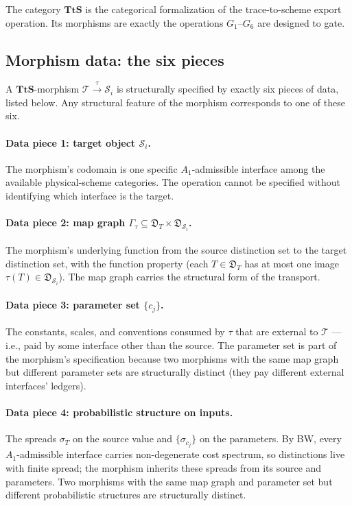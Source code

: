 The category $\mathbf{TtS}$ is the categorical formalization of the trace-to-scheme export operation. Its morphisms are exactly the operations $G_1$--$G_6$ are designed to gate.

\subsection{Morphism data: the six pieces}
\label{subsec:morphism-data}

\begin{lemma}
\label{lem:morphism-data}
A $\mathbf{TtS}$-morphism $\mathcal{T} \xrightarrow{\tau} \mathcal{S}_i$ is structurally specified by exactly six pieces of data, listed below. Any structural feature of the morphism corresponds to one of these six.
\end{lemma}

\paragraph{Data piece 1: target object $\mathcal{S}_i$.} The morphism's codomain is one specific $A_1$-admissible interface among the available physical-scheme categories. The operation cannot be specified without identifying which interface is the target.

\paragraph{Data piece 2: map graph $\Gamma_\tau \subseteq \mathfrak{D}_T \times \mathfrak{D}_{\mathcal{S}_i}$.} The morphism's underlying function from the source distinction set to the target distinction set, with the function property (each $T \in \mathfrak{D}_T$ has at most one image $\tau(T) \in \mathfrak{D}_{\mathcal{S}_i}$). The map graph carries the structural form of the transport.

\paragraph{Data piece 3: parameter set $\{c_j\}$.} The constants, scales, and conventions consumed by $\tau$ that are external to $\mathcal{T}$ — i.e., paid by some interface other than the source. The parameter set is part of the morphism's specification because two morphisms with the same map graph but different parameter sets are structurally distinct (they pay different external interfaces' ledgers).

\paragraph{Data piece 4: probabilistic structure on inputs.} The spreads $\sigma_T$ on the source value and $\{\sigma_{c_j}\}$ on the parameters. By BW, every $A_1$-admissible interface carries non-degenerate cost spectrum, so distinctions live with finite spread; the morphism inherits these spreads from its source and parameters. Two morphisms with the same map graph and parameter set but different probabilistic structures are structurally distinct.

